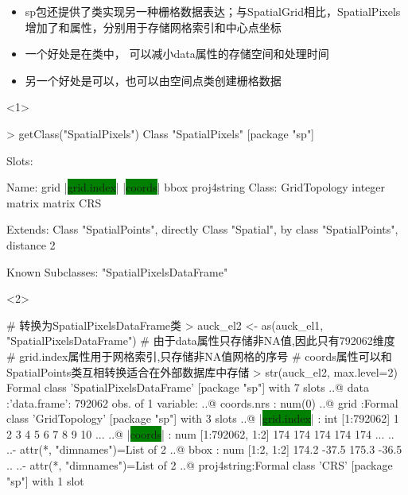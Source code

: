 \begin{frame}[t,fragile]{\subsecname}{\subsubsecname}
\begin{itemize}
\item<1-> sp包还提供了类实现另一种栅格数据表达；与SpatialGrid相比，SpatialPixels
增加了和属性，分别用于存储网格索引和中心点坐标
\item<2-> 一个好处是在类中，
可以减小data属性的存储空间和处理时间
\item<2-> 另一个好处是可以，也可以由空间点类创建栅格数据
\end{itemize}

\begin{overlayarea}{\textwidth}{\textheight}
\begin{onlyenv}<1>
\begin{rcode}
> getClass("SpatialPixels")
Class "SpatialPixels" [package "sp"]

Slots:
                                                                       
Name:          grid   |\colorbox{green}{grid.index}|       |\colorbox{green}{coords}|         bbox  proj4string
Class: GridTopology      integer       matrix       matrix          CRS

Extends: 
Class "SpatialPoints", directly
Class "Spatial", by class "SpatialPoints", distance 2

Known Subclasses: "SpatialPixelsDataFrame"
\end{rcode}
\end{onlyenv}

\begin{onlyenv}<2>
\begin{rcode}
# 转换为SpatialPixelsDataFrame类
> auck_el2 <- as(auck_el1, "SpatialPixelsDataFrame")
# 由于data属性只存储非NA值,因此只有792062维度
# grid.index属性用于网格索引,只存储非NA值网格的序号
# coords属性可以和SpatialPoints类互相转换适合在外部数据库中存储
> str(auck_el2, max.level=2)
Formal class 'SpatialPixelsDataFrame' [package "sp"] with 7 slots
  ..@ data       :'data.frame': 792062 obs. of  1 variable:
  ..@ coords.nrs : num(0) 
  ..@ grid       :Formal class 'GridTopology' [package "sp"] with 3 slots
  ..@ |\colorbox{green}{grid.index}| : int [1:792062] 1 2 3 4 5 6 7 8 9 10 ...
  ..@ |\colorbox{green}{coords}|     : num [1:792062, 1:2] 174 174 174 174 174 ...
  .. ..- attr(*, "dimnames")=List of 2
  ..@ bbox       : num [1:2, 1:2] 174.2 -37.5 175.3 -36.5
  .. ..- attr(*, "dimnames")=List of 2
  ..@ proj4string:Formal class 'CRS' [package "sp"] with 1 slot
\end{rcode}
\end{onlyenv}


\end{overlayarea}
\end{frame}

